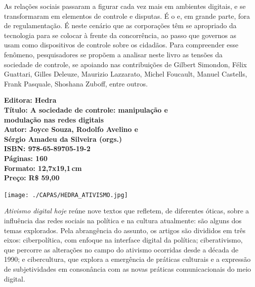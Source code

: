 \noindent{}As relações sociais passaram a figurar cada vez mais em ambientes digitais, e se transformaram em elementos de controle e disputas. É o  e, em grande parte, fora de regulamentação. É neste cenário que as corporações têm se apropriado da tecnologia para se colocar à frente da concorrência, ao passo que governos as usam como dispositivos de controle sobre os cidadãos. Para compreender esse fenômeno, pesquisadores se propõem a analisar neste livro as tensões da sociedade de controle, se apoiando nas contribuições de Gilbert Simondon, Félix Guattari, Gilles Deleuze, Maurizio Lazzarato, Michel Foucault, Manuel Castells, Frank Pasquale, Shoshana Zuboff, entre outros.

\vfill
\noindent\begin{minipage}[c]{1\linewidth}
{\small\textbf{
\hspace*{-.1cm}Editora: Hedra\\
Título: A sociedade de controle: manipulação e\\modulação nas redes digitais\\
Autor: Joyce Souza, Rodolfo Avelino e\\Sérgio Amadeu da Silveira (orgs.)\\ 
ISBN: 978-65-89705-19-2\\
Páginas: 160\\
Formato: 12,7x19,1\,cm\\
Preço: R\$ 59,00\\
}}
\end{minipage}
\pagebreak

\begin{center}
\hspace*{.5cm}\texttt{[image: ./CAPAS/HEDRA\_ATIVISMO.jpg]}
\end{center}
\hspace*{-7cm}\hrulefill\hspace*{-7cm}
\medskip

\noindent{}\textit{Ativismo digital hoje} reúne nove textos que refletem, de diferentes óticas, sobre a influência das redes sociais na política e na cultura atualmente:  são alguns dos temas explorados.
Pela abrangência do assunto, os artigos são divididos em três eixos: ciberpolítica, com enfoque na interface digital da política; ciberativismo, que percorre as alterações no campo do ativismo ocorridas desde a década de 1990; e cibercultura, que explora a emergência de práticas culturais e a expressão de subjetividades em consonância com as novas práticas comunicacionais do meio digital.

